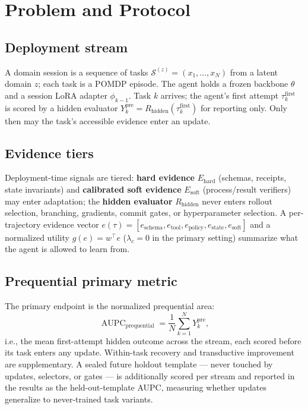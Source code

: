 \section{Problem and Protocol}
\subsection{Deployment stream}
A domain session is a sequence of tasks
$\mathcal{S}^{(z)}=(x_1,\dots,x_N)$ from a latent domain $z$; each task
is a POMDP episode. The agent holds a frozen backbone $\theta$ and a
session LoRA adapter $\phi_{k-1}$. Task $k$ arrives; the agent's
first attempt $\tau_k^{\mathrm{first}}$ is scored by a hidden evaluator
$Y_k^{\mathrm{pre}}=R_{\mathrm{hidden}}(\tau_k^{\mathrm{first}})$ for
reporting only. Only then may the task's accessible evidence enter an
update.

\subsection{Evidence tiers}
Deployment-time signals are tiered: \textbf{hard evidence} $E_{\mathrm{hard}}$
(schemas, receipts, state invariants) and \textbf{calibrated soft
evidence} $E_{\mathrm{soft}}$ (process/result verifiers) may enter
adaptation; the \textbf{hidden evaluator} $R_{\mathrm{hidden}}$ never
enters rollout selection, branching, gradients, commit gates, or
hyperparameter selection. A per-trajectory evidence vector
$e(\tau)=[e_{\mathrm{schema}},e_{\mathrm{tool}},e_{\mathrm{policy}},
e_{\mathrm{state}},e_{\mathrm{soft}}]$ and a normalized utility
$g(e)=w^\top e$ ($\lambda_c=0$ in the primary setting) summarize what
the agent is allowed to learn from.

\subsection{Prequential primary metric}
The primary endpoint is the normalized prequential area:
\begin{equation}
\operatorname{AUPC}_{\mathrm{prequential}}
=\frac{1}{N}\sum_{k=1}^{N} Y_k^{\mathrm{pre}},
\end{equation}
i.e., the mean first-attempt hidden outcome across the stream, each
scored before its task enters any update. Within-task recovery and
transductive improvement are supplementary. A sealed future holdout
template --- never touched by updates, selectors, or gates --- is
additionally scored per stream and reported in the results as the
held-out-template AUPC, measuring whether updates generalize to
never-trained task variants.


